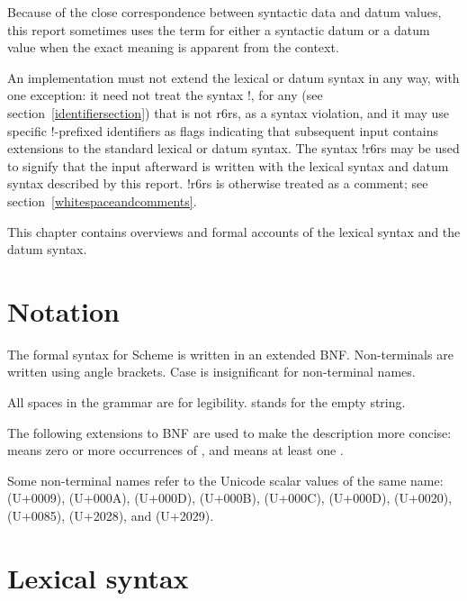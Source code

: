 Because of the close correspondence between syntactic data and datum
values, this report sometimes uses the term  for
either a syntactic datum or a datum value when the exact meaning
is apparent from the context.

An implementation must not extend the lexical or datum syntax in
any way, with one exception: it need not treat the syntax
{\cf \sharpsign{}!}, for any  (see
section~\ref{identifiersection}) that is not {\cf r6rs}, as a syntax
violation, and it may use specific {\cf \sharpsign{}!}-prefixed
identifiers as flags indicating that subsequent input contains extensions
to the standard lexical or datum syntax. 
The syntax {\cf \sharpsign{}!r6rs} may be used to signify that
the input afterward is written with the lexical syntax and
datum syntax described by
this report.
{\cf \sharpsign{}!r6rs} is otherwise treated as a comment; see section~\ref{whitespaceandcomments}.

This chapter contains overviews and formal accounts of the lexical
syntax and the datum syntax.

\section{Notation}
\label{BNF}

The formal syntax for Scheme is written in an extended BNF.
Non-terminals are written using angle brackets.  Case is insignificant
for non-terminal names.

All spaces in the grammar are for legibility.
 stands for the empty string.

The following extensions to BNF are used to make the description more
concise:   means zero or more occurrences of
, and  means at least one
.

Some non-terminal names refer to the Unicode scalar values of the same
name:  (U+0009),  (U+000A),
 (U+000D),  (U+000B),
 (U+000C),  (U+000D),
 (U+0020),  (U+0085),  (U+2028), and  (U+2029).

\section{Lexical syntax}
\label{lexicalsyntaxsection}

